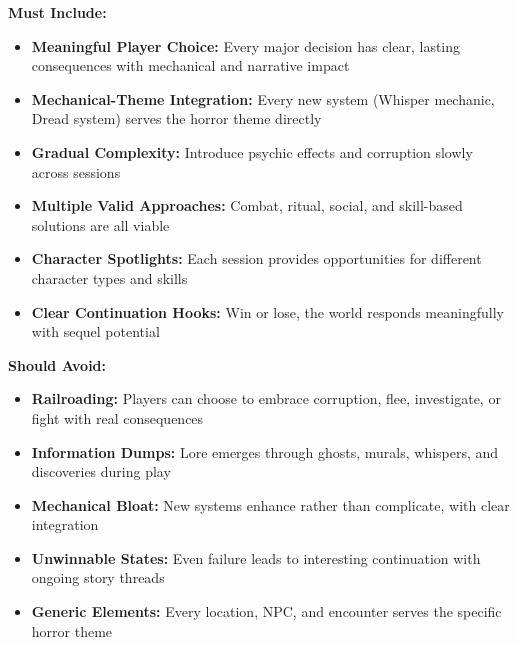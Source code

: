 \documentclass[11pt]{article}
\begin{document}
\begin{itemize}
\begin{itemize}
\begin{itemize}
\begin{itemize}
\textbf{Must Include:} \begin{itemize} \item \checkmark \textbf{Meaningful Player Choice:} Every major decision has clear, lasting consequences with mechanical and narrative impact \item \checkmark \textbf{Mechanical-Theme Integration:} Every new system (Whisper mechanic, Dread system) serves the horror theme directly \item \checkmark \textbf{Gradual Complexity:} Introduce psychic effects and corruption slowly across sessions \item \checkmark \textbf{Multiple Valid Approaches:} Combat, ritual, social, and skill-based solutions are all viable \item \checkmark \textbf{Character Spotlights:} Each session provides opportunities for different character types and skills \item \checkmark \textbf{Clear Continuation Hooks:} Win or lose, the world responds meaningfully with sequel potential \end{itemize}

\textbf{Should Avoid:} \begin{itemize} \item \checkmark \textbf{Railroading:} Players can choose to embrace corruption, flee, investigate, or fight with real consequences \item \checkmark \textbf{Information Dumps:} Lore emerges through ghosts, murals, whispers, and discoveries during play \item \checkmark \textbf{Mechanical Bloat:} New systems enhance rather than complicate, with clear integration \item \checkmark \textbf{Unwinnable States:} Even failure leads to interesting continuation with ongoing story threads \item \checkmark \textbf{Generic Elements:} Every location, NPC, and encounter serves the specific horror theme \end{itemize}


\end{itemize}
\end{itemize}
\end{itemize}
\end{itemize}
\end{document}
